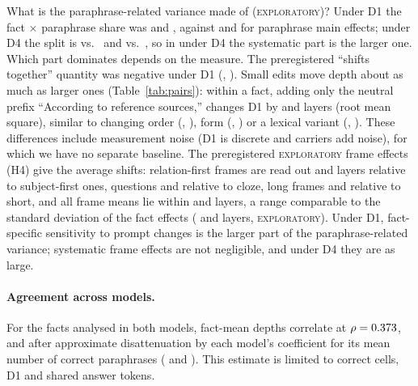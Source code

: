 \documentclass[11pt]{article}
\newcommand{\expl}{\textsc{exploratory}\xspace}
\newcommand{\olmo}{\OlmoTwoSevenB}
\begin{document}
What is the paraphrase-related variance made of (\expl)?
Under D1 the fact $\times$ paraphrase share was \explFtShareLlama{} and \explFtShareOlmo, against \explSysWordShareLlama{} and \explSysWordShareOlmo{} for paraphrase main effects; under D4 the split is \explDFourFtLlama{} vs.\ \explDFourSysLlama{} and \explDFourFtOlmo{} vs.\ \explDFourSysOlmo, so in \olmo{} under D4 the systematic part is the larger one. Which part dominates depends on the measure.
The preregistered ``shifts together'' quantity was negative under D1 (\ptTfResidLlama, \ptTfResidOlmo).
Small edits move depth about as much as larger ones (Table~\ref{tab:pairs}): within a fact, adding only the neutral prefix ``According to reference sources,'' changes D1 by \explPairPrefixLlama{} and \explPairPrefixOlmo{} layers (root mean square), similar to changing order (\explPairOrderLlama, \explPairOrderOlmo), form (\explPairFormLlama, \explPairFormOlmo) or a lexical variant (\explPairLexicalLlama, \explPairLexicalOlmo).
These differences include measurement noise (D1 is discrete and carriers add noise), for which we have no separate baseline. The preregistered \expl frame effects (H4) give the average shifts: relation-first frames are read out \explHFourOrderLlama{} and \explHFourOrderOlmo{} layers relative to subject-first ones, questions \explHFourFormLlama{} and \explHFourFormOlmo{} relative to cloze, long frames \explHFourLengthLlama{} and \explHFourLengthOlmo{} relative to short, and all frame means lie within \explHFourRangeLlama{} and \explHFourRangeOlmo{} layers, a range comparable to the standard deviation of the fact effects (\explSdFactLayersLlama{} and \explSdFactLayersOlmo{} layers, \expl).
Under D1, fact-specific sensitivity to prompt changes is the larger part of the paraphrase-related variance; systematic frame effects are not negligible, and under D4 they are as large.

\paragraph{Agreement across models.}
For the \ptHThreeN{} facts analysed in both models, fact-mean depths correlate at $\rho=0.373$, and \ptHThreeDisatt{} after approximate disattenuation by each model's coefficient for its mean number of correct paraphrases (\ptHThreeKbarLlama{} and \ptHThreeKbarOlmo).
This estimate is limited to correct cells, D1 and shared answer tokens.
\end{document}
